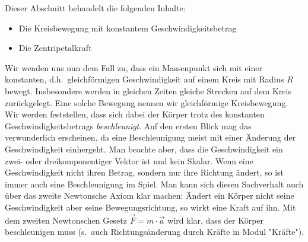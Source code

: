   
  \begin{MIntro}
  Dieser Abschnitt behandelt die folgenden Inhalte:
  \begin{itemize}
  \item {Die Kreisbewegung mit konstantem Geschwindigkeitsbetrag}
  \item {Die Zentripetalkraft}
  \end{itemize}
  
  
  Wir wenden uns nun dem Fall zu, dass ein Massenpunkt sich mit einer konstanten, d.h.~gleichf\"ormigen Geschwindigkeit auf einem Kreis mit Radius $R$ bewegt. Insbesondere werden in gleichen Zeiten gleiche Strecken auf dem Kreis zur\"uckgelegt. Eine solche Bewegung nennen wir gleichf\"ormige Kreisbewegung. Wir werden feststellen, dass sich dabei der K\"orper trotz des konstanten Geschwindigkeitsbetrags \emph{beschleunigt}. Auf den ersten Blick mag das verwunderlich erscheinen, da eine Beschleunigung meist mit einer \"Anderung der Geschwindigkeit einhergeht. Man beachte aber, dass die Geschwindigkeit ein zwei- oder dreikomponentiger Vektor ist und kein Skalar. Wenn eine Geschwindigkeit nicht ihren Betrag, sondern nur ihre Richtung \"andert, so ist immer auch eine Beschleunigung im Spiel. Man kann sich diesen Sachverhalt auch \"uber das zweite Newtonsche Axiom klar machen: \"Andert ein K\"orper nicht seine Geschwindigkeit aber seine Bewegungsrichtung, so wirkt eine Kraft auf ihn. Mit dem zweiten Newtonschen Gesetz $\vec{F}=m\cdot \vec{a}$ wird klar, dass der K\"orper beschleunigen muss (s.~auch Richtungs\"anderung durch Kr\"afte in Modul "Kr\"afte").
  \end{MIntro}
  
